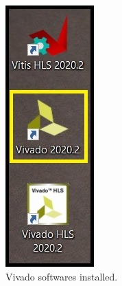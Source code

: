 \begin{figure}[H]
\centering
  \includegraphics[width=0.8\linewidth]{images/VivadoInstimg020.jpg}
  \captionsetup{width=0.8\linewidth}
  \caption{Vivado softwares installed.}
  \label{fig:VivadoInstimg020}
\end{figure}

